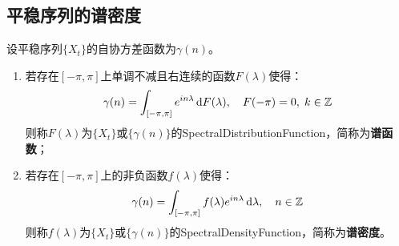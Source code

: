 \subsection{平稳序列的谱密度}
\begin{definition}
	设平稳序列$\{X_t\}$的自协方差函数为$\gamma(n)$。
	\begin{enumerate}
		\item 若存在$[-\pi,\pi]$上单调不减且右连续的函数$F(\lambda)$使得：
		\begin{equation*}
			\gamma(n)=\int_{[-\pi,\pi]}e^{in\lambda}\mathop{}\!\mathrm{d} F(\lambda),\quad F(-\pi)=0,\;k\in\mathbb{Z}^{}
		\end{equation*}
		则称$F(\lambda)$为$\{X_t\}$或$\{\gamma(n)\}$的\gls{SpectralDistributionFunction}，简称为\textbf{谱函数}；
		\item 若存在$[-\pi,\pi]$上的非负函数$f(\lambda)$使得：
		\begin{equation*}
			\gamma(n)=\int_{[-\pi,\pi]}f(\lambda)e^{in\lambda}\mathop{}\!\mathrm{d}\lambda,\quad n\in\mathbb{Z}^{}
		\end{equation*}
		则称$f(\lambda)$为$\{X_t\}$或$\{\gamma(n)\}$的\gls{SpectralDensityFunction}，简称为\textbf{谱密度}。
	\end{enumerate}
\end{definition}







